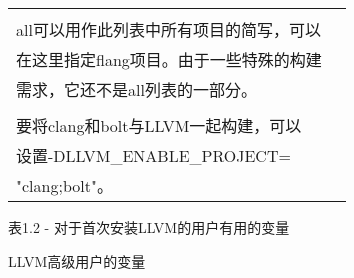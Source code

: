 \begin{longtable}{|l|l|}
\begin{tabular}[c]{@{}l@{}}
\\all可以用作此列表中所有项目的简写，可以\\ 在这里指定flang项目。由于一些特殊的构建\\ 需求，它还不是all列表的一部分。\\
\\
要将clang和bolt与LLVM一起构建，可以\\ 设置-DLLVM\_ENABLE\_PROJECT=\\ "clang;bolt"。
\end{tabular} \\ \hline
\end{longtable}

\begin{center}
表1.2 - 对于首次安装LLVM的用户有用的变量
\end{center}

LLVM高级用户的变量

